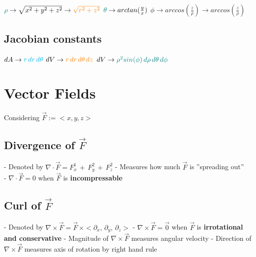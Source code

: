 \documentclass[12pt, letterpaper]{article}
\begin{document}
  \noindent $\textcolor{teal}{\rho} \rightarrow \sqrt{x^{2} + y^{2} + z^{2}} \rightarrow \textcolor{orange}{\sqrt{r^{2} + z^{2}}}$ \newline
  $\textcolor{teal}{\theta} \rightarrow arctan(\frac{y}{x})$ \newline
  $\phi \rightarrow arccos(\frac{z}{\rho}) \rightarrow arccos(\frac{z}{\rho})$ \newline

  \subsection*{Jacobian constants}

  $dA \rightarrow \textcolor{cyan}{r\,dr\,d\theta}$ \newline
  $dV \rightarrow \textcolor{orange}{r\,dr\,d\theta\,dz}$ \newline
  $dV \rightarrow \textcolor{teal}{\rho^{2}sin(\phi)\,d\rho\,d\theta\,d\phi}$

\pagebreak

  \section*{Vector Fields}
  Considering $ \vec{F} := <x, y, z>$

  \subsection*{Divergence of $\vec{F}$}

  - Denoted by $\nabla \cdot \vec{F} = F_{x}^{1}\,+\,F_{y}^{2}\,+\,F_{z}^{2}$ \newline
  - Measures how much $\vec{F}$ is ''spreading out'' \\
  - $\nabla \cdot \vec{F} = 0$ when $\vec{F}$ is \textbf{incompressable}
  
  \subsection*{Curl of $\vec{F}$}
  - Denoted by $\nabla \times \vec{F} = \vec{F} \, \times <\partial_x ,\, \partial_y ,\, \partial_z >$ \newline
  - $\nabla \times \vec{F} = \vec{0}$ when $\vec{F}$ is \textbf{irrotational and conservative} \newline
  - Magnitude of $\nabla \times \vec{F}$ measures angular velocity \newline
  - Direction of $\nabla \times \vec{F}$ measures axis of rotation by right hand rule \newline
\end{document}
